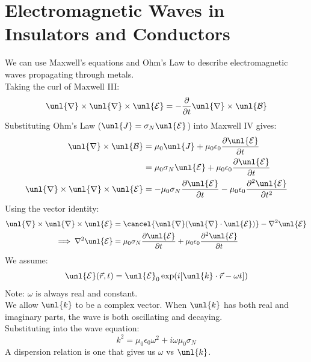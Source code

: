 \documentclass[a4paper, 11pt, normalem]{report}
\newcommand\p{\partial}
\newcommand\E{\mathcal{E}}
\newcommand\uE{\unl{\E}}
\newcommand\B{\mathcal{B}}
\newcommand\uB{\unl{\B}}
\newcommand\del{\unl{\nabla}}
\newcommand\eno{\epsilon_0}
\newcommand\vk{\unl{k}}
\newcommand\J{\unl{J}}
\begin{document}
\section{Electromagnetic Waves in Insulators and Conductors}
We can use Maxwell's equations and Ohm's Law to describe electromagnetic waves propagating through metals. \\
Taking the curl of Maxwell \RN{3}:
\begin{equation*}
    \del \times \del \times \uE = -\frac{\p}{\p t}\del \times \uB
\end{equation*}
Substituting Ohm's Law ($\J = \sigma_N\uE$) into Maxwell \RN{4} gives:
\begin{align*}
    \del\times\uB &= \mu_0\J + \mu_0\eno\frac{\p \uE}{\p t} \\
    &= \mu_0\sigma_N\uE + \mu_0\eno\frac{\p\uE}{\p t} \\
    \del \times \del \times \uE &= -\mu_0\sigma_N\frac{\p\uE}{\p t} - \mu_0\eno\frac{\p^2\uE}{\p t^2}
\end{align*}
Using the vector identity:
\begin{align*}
    \del\times\del\times\uE &= \cancel{\del(\del\cdot\uE)} - \nabla^2\uE \\
    \implies \nabla^2\uE &= \mu_0\sigma_N\frac{\p\uE}{\p t} + \mu_0\eno\frac{\p^2\uE}{\p t}
\end{align*}
We assume:
\begin{equation*}
    \uE(\vec{r},t) = \uE_0\exp(i[\vk\cdot\vec{r}-\omega t])
\end{equation*}
Note: $\omega$ is always real and constant. \\
We allow $\vk$ to be a complex vector.
When $\vk$ has both real and imaginary parts, the wave is both oscillating and decaying. \\
Substituting into the wave equation:
\begin{equation}
    k^2 = \mu_0\eno\omega^2 + i\omega\mu_0\sigma_N \tag{Dispersion Relation}
\end{equation}
A dispersion relation is one that gives us $\omega$ vs $\vk$.
\end{document}
